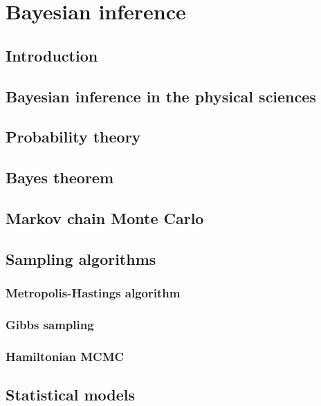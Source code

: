 \chapter{Bayesian inference}\label{ch:Bayesian}

\section{Introduction}
\section{Bayesian inference in the physical sciences}
\section{Probability theory}
\section{Bayes theorem}
\section{Markov chain Monte Carlo}
\section{Sampling algorithms}
\subsection{Metropolis-Hastings algorithm}
\subsection{Gibbs sampling}
\subsection{Hamiltonian MCMC} 
\section{Statistical models}